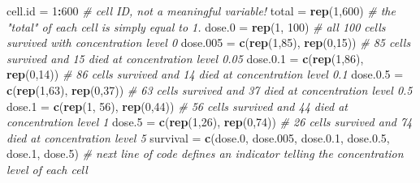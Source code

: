 \documentclass[
]{book}
\newenvironment{Shaded}{\begin{snugshade}}{\end{snugshade}}
\newcommand{\CommentTok}[1]{\textcolor[rgb]{0.56,0.35,0.01}{\textit{#1}}}
\newcommand{\DecValTok}[1]{\textcolor[rgb]{0.00,0.00,0.81}{#1}}
\newcommand{\FloatTok}[1]{\textcolor[rgb]{0.00,0.00,0.81}{#1}}
\newcommand{\FunctionTok}[1]{\textcolor[rgb]{0.13,0.29,0.53}{\textbf{#1}}}
\newcommand{\NormalTok}[1]{#1}
\newcommand{\OtherTok}[1]{\textcolor[rgb]{0.56,0.35,0.01}{#1}}
\newcommand{\SpecialCharTok}[1]{\textcolor[rgb]{0.81,0.36,0.00}{\textbf{#1}}}
\begin{document}
\begin{Shaded}
\begin{Highlighting}[]
\NormalTok{cell.id }\OtherTok{=} \DecValTok{1}\SpecialCharTok{:}\DecValTok{600}                     \CommentTok{\# cell ID, not a meaningful variable!}
\NormalTok{total }\OtherTok{=} \FunctionTok{rep}\NormalTok{(}\DecValTok{1}\NormalTok{,}\DecValTok{600}\NormalTok{)                  }\CommentTok{\# the "total" of each cell is simply equal to 1.}
\NormalTok{dose}\FloatTok{.0} \OtherTok{=} \FunctionTok{rep}\NormalTok{(}\DecValTok{1}\NormalTok{, }\DecValTok{100}\NormalTok{)                }\CommentTok{\# all 100 cells survived with concentration level 0}
\NormalTok{dose}\FloatTok{.005} \OtherTok{=} \FunctionTok{c}\NormalTok{(}\FunctionTok{rep}\NormalTok{(}\DecValTok{1}\NormalTok{,}\DecValTok{85}\NormalTok{), }\FunctionTok{rep}\NormalTok{(}\DecValTok{0}\NormalTok{,}\DecValTok{15}\NormalTok{))  }\CommentTok{\# 85 cells survived and 15 died at concentration level 0.05}
\NormalTok{dose.}\FloatTok{0.1} \OtherTok{=} \FunctionTok{c}\NormalTok{(}\FunctionTok{rep}\NormalTok{(}\DecValTok{1}\NormalTok{,}\DecValTok{86}\NormalTok{), }\FunctionTok{rep}\NormalTok{(}\DecValTok{0}\NormalTok{,}\DecValTok{14}\NormalTok{))  }\CommentTok{\# 86 cells survived and 14 died at concentration level 0.1}
\NormalTok{dose.}\FloatTok{0.5} \OtherTok{=} \FunctionTok{c}\NormalTok{(}\FunctionTok{rep}\NormalTok{(}\DecValTok{1}\NormalTok{,}\DecValTok{63}\NormalTok{), }\FunctionTok{rep}\NormalTok{(}\DecValTok{0}\NormalTok{,}\DecValTok{37}\NormalTok{))  }\CommentTok{\# 63 cells survived and 37 died at concentration level 0.5}
\NormalTok{dose}\FloatTok{.1} \OtherTok{=} \FunctionTok{c}\NormalTok{(}\FunctionTok{rep}\NormalTok{(}\DecValTok{1}\NormalTok{, }\DecValTok{56}\NormalTok{), }\FunctionTok{rep}\NormalTok{(}\DecValTok{0}\NormalTok{,}\DecValTok{44}\NormalTok{))   }\CommentTok{\# 56 cells survived and 44 died at concentration level 1}
\NormalTok{dose}\FloatTok{.5} \OtherTok{=} \FunctionTok{c}\NormalTok{(}\FunctionTok{rep}\NormalTok{(}\DecValTok{1}\NormalTok{,}\DecValTok{26}\NormalTok{), }\FunctionTok{rep}\NormalTok{(}\DecValTok{0}\NormalTok{,}\DecValTok{74}\NormalTok{))    }\CommentTok{\# 26 cells survived and 74 died at concentration level 5}
\NormalTok{survival }\OtherTok{=} \FunctionTok{c}\NormalTok{(dose}\FloatTok{.0}\NormalTok{, dose}\FloatTok{.005}\NormalTok{, dose.}\FloatTok{0.1}\NormalTok{, dose.}\FloatTok{0.5}\NormalTok{, dose}\FloatTok{.1}\NormalTok{, dose}\FloatTok{.5}\NormalTok{)  }
\CommentTok{\# next line of code defines an indicator telling the concentration level of each cell}

\end{Highlighting}
\end{Shaded}
\end{document}
